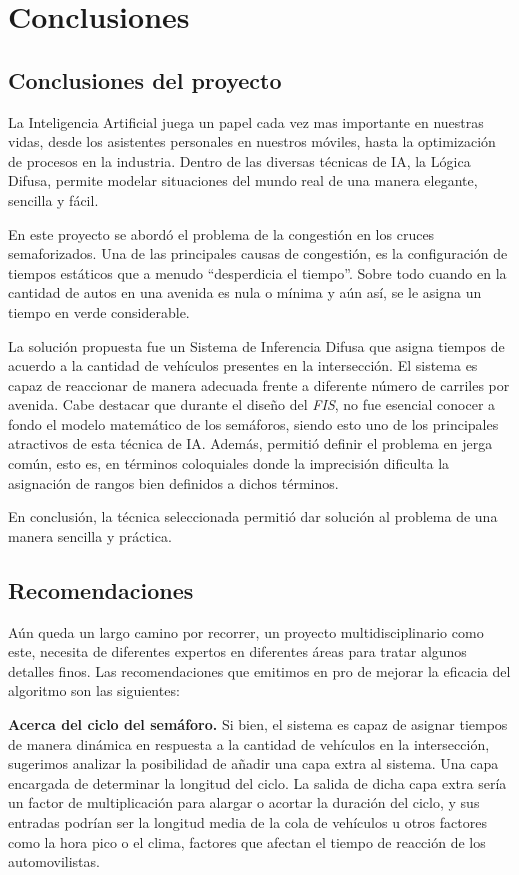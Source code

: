 \chapter{Conclusiones}

\section{Conclusiones del proyecto}
La Inteligencia Artificial juega un papel cada vez mas importante en nuestras vidas, desde los asistentes personales en nuestros móviles, hasta la optimización de procesos en la industria. Dentro de las diversas técnicas de IA, la Lógica Difusa, permite modelar situaciones del mundo real de una manera elegante, sencilla y fácil.

En este proyecto se abordó el problema de la congestión en los cruces semaforizados. Una de las principales causas de congestión, es la configuración de tiempos estáticos que a menudo ``desperdicia el tiempo''. Sobre todo cuando en la cantidad de autos en una avenida es nula o mínima y aún así, se le asigna un tiempo en verde considerable.

La solución propuesta fue un Sistema de Inferencia Difusa que asigna tiempos de acuerdo a la cantidad de vehículos presentes en la intersección. El sistema es capaz de reaccionar de manera adecuada frente a diferente número de carriles por avenida. Cabe destacar que durante el diseño del \textit{FIS}, no fue esencial conocer a fondo el modelo matemático de los semáforos, siendo esto uno de los principales atractivos de esta técnica de IA. Además, permitió definir el problema en jerga común, esto es, en términos coloquiales donde la imprecisión dificulta la asignación de rangos bien definidos a dichos términos.

En conclusión, la técnica seleccionada permitió dar solución al problema de una manera sencilla y práctica. 

\section{Recomendaciones}
Aún queda un largo camino por recorrer, un proyecto multidisciplinario como este, necesita de diferentes expertos en diferentes áreas para tratar algunos detalles finos. Las recomendaciones que emitimos en pro de mejorar la eficacia del algoritmo son las siguientes:

\textbf{Acerca del ciclo del semáforo.}
Si bien, el sistema es capaz de asignar tiempos de manera dinámica en respuesta a la cantidad de vehículos en la intersección, sugerimos analizar la posibilidad de añadir una capa extra al sistema. Una capa encargada de determinar la longitud del ciclo. La salida de dicha capa extra sería un factor de multiplicación para alargar o acortar la duración del ciclo, y sus entradas podrían ser la longitud media de la cola de vehículos u otros factores como la hora pico o el clima, factores que afectan el tiempo de reacción de los automovilistas.

